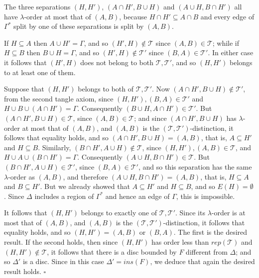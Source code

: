 The three separations $(H, H')$, $(A \cap H', B \cup H)$ and $(A \cup H, B \cap H')$ all have $\lambda$-order at most that of $(A, B)$, because $H \cap H' \subseteq A \cap B$ and every edge of $\Gamma^*$ split by one of these separations is split by $(A, B)$.

If $H \subseteq A$ then $A \cup H' = \Gamma$, and so $(H', H) \notin \mathscr{T}$ since $(A, B) \in \mathscr{T}$; while if $H \subseteq B$ then $B \cup H = \Gamma$, and so $(H', H) \notin \mathscr{T}'$ since $(B, A) \in \mathscr{T}'$. In either case it follows that $(H', H)$ does not belong to both $\mathscr{T}, \mathscr{T}'$, and so $(H, H')$ belongs to at least one of them.

Suppose that $(H, H')$ belongs to both of $\mathscr{T}, \mathscr{T}'$. Now $(A \cap H', B \cup H) \notin \mathscr{T}'$, from the second tangle axiom, since $(H, H'), (B, A) \in \mathscr{T}'$ and $H \cup B \cup (A \cap H') = \Gamma$. Consequently $(B \cup H, A \cap H') \in \mathscr{T}'$. But $(A \cap H', B \cup H) \in \mathscr{T}$, since $(A, B) \in \mathscr{T}$; and since $(A \cap H', B \cup H)$ has $\lambda$-order at most that of $(A, B)$, and $(A, B)$ is the $(\mathscr{T}, \mathscr{T}')$-distinction, it follows that equality holds, and so $(A \cap H', B \cup H) = (A, B)$, that is, $A \subseteq H'$ and $H \subseteq B$. Similarly, $(B \cap H', A \cup H) \notin \mathscr{T}$, since $(H, H'), (A, B) \in \mathscr{T}$, and $H \cup A \cup (B \cap H') = \Gamma$. Consequently $(A \cup H, B \cap H') \in \mathscr{T}$. But $(B \cap H', A \cup H) \in \mathscr{T}'$, since $(B, A) \in \mathscr{T}'$, and so this separation has the same $\lambda$-order as $(A, B)$, and therefore $(A \cup H, B \cap H') = (A, B)$, that is, $H \subseteq A$ and $B \subseteq H'$. But we already showed that $A \subseteq H'$ and $H \subseteq B$, and so $E(H) = \emptyset$. Since $\Delta$ includes a region of $\Gamma^*$ and hence an edge of $\Gamma$, this is impossible.

It follows that $(H, H')$ belongs to exactly one of $\mathscr{T}, \mathscr{T}'$. Since its $\lambda$-order is at most that of $(A, B)$, and $(A, B)$ is the $(\mathscr{T}, \mathscr{T}')$-distinction, it follows that equality holds, and so $(H, H') = (A, B)$ or $(B, A)$. The first is the desired result. If the second holds, then since $(H, H')$ has order less than $rep(\mathscr{T})$ and $(H, H') \notin \mathscr{T}$, it follows that there is a disc bounded by $F$ different from $\Delta$; and so $\Delta'$ is a disc. Since in this case $\Delta' = ins(F)$, we deduce that again the desired result holds. $\square$

